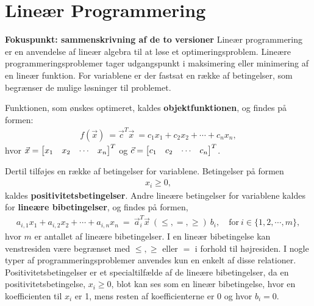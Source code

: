 \chapter{Lineær Programmering}
\textbf{Fokuspunkt: sammenskrivning af de to versioner}
Lineær programmering er en anvendelse af lineær algebra til at løse et optimeringsproblem. Lineære programmeringsproblemer tager udgangspunkt i maksimering eller minimering af en lineær funktion. For variablene er der fastsat en række af betingelser, som begrænser de mulige løsninger til problemet.


Funktionen, som ønskes optimeret, kaldes \textbf{objektfunktionen}, og findes på formen:
\begin{align}
f(\vec{x})\ = \vec{c}^T \vec{x} \ =  c_1x_1 + c_2x_2 + \cdots + c_nx_n,
\end{align}
hvor $\vec{x}= \begin{bmatrix} x_1 & x_2 & \cdots & x_n \end{bmatrix}^T$ og $\vec{c}= \begin{bmatrix} c_1 & c_2 & \cdots & c_n \end{bmatrix}^T$.

\begin{comment}
Bør muligvis være en defintion, behøver ikke at skrives ud, men så skal f(\vec{x}) frem for f(x_1, ..., x_n).  Men det er jo variable repræcenteret ved en vektor så måske introducerer f(x_1, ..., x_n), udenfor definitionen.
\begin{defn}
Betragt et lineært programmerings problem, da er \textbf{objektfunktionen}
\begin{align*}
f(\vec{x}) = \vec{c}^T \cdot \vec{x}, 
\end{align*}
for $\vec{x}, \vec{c} \in \mathds{R}^n$, funktionen, som ønskes optimeret.
\end{defn} Eller noget, det er vigtigt at denne definition, vil kræve at vektor x og c bliver introduceret i den bindende tekst.
\end{comment}


Dertil tilføjes en række af betingelser for variablene. Betingelser på formen
\begin{align}
	x_i \geq 0,
\end{align}
kaldes \textbf{positivitetsbetingelser}.
Andre lineære betingelser for variablene kaldes for \textbf{lineære bibetingelser}, og findes på formen, 
\begin{align}
	a_{i,1} x_1 + a_{i,2} x_2 + \cdots + a_{i,n} x_n \  = \ \vec{a}_i^T\vec{x} \ (\leq,=,\geq) \  b_i, \quad \text{for} \ i \in \{1,2,\cdots, m\}, %
\end{align}
hvor $m$ er antallet af lineære bibetingelser. I en lineær bibetingelse kan venstresiden være begrænset med $\leq, \geq$ eller $=$ i forhold til højresiden. I nogle typer af programmeringsproblemer anvendes kun en enkelt af disse relationer. Positivitetsbetingelser er et specialtilfælde af de lineære bibetingelser, da en positivitetsbetingelse, $x_i \geq 0$, blot kan ses som en lineær bibetingelse, hvor en koefficienten til $x_i$ er 1, mens resten af koefficienterne er 0 og hvor $b_i=0$.

